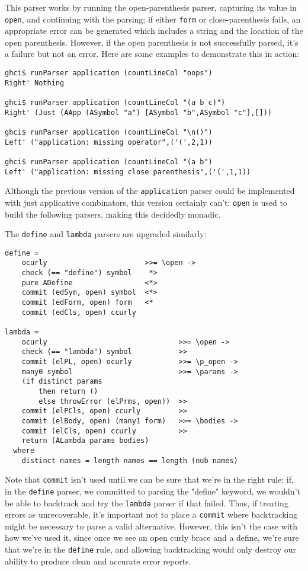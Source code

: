 \documentclass{tmr}
\begin{document}
This parser works by running the open-parenthesis parser, capturing its value in \verb+open+, and continuing
with the parsing; if either \verb+form+ or close-parenthesis fails, an appropriate error can be generated
which includes a string and the location of the open parenthesis.  However, if the open parenthesis is not
successfully parsed, it's a failure but not an error.  Here are some examples to demonstrate this in action:
\begin{verbatim}
ghci$ runParser application (countLineCol "oops")
Right' Nothing

ghci$ runParser application (countLineCol "(a b c)")
Right' (Just (AApp (ASymbol "a") [ASymbol "b",ASymbol "c"],[]))

ghci$ runParser application (countLineCol "\n()")
Left' ("application: missing operator",('(',2,1))

ghci$ runParser application (countLineCol "(a b")
Left' ("application: missing close parenthesis",('(',1,1))
\end{verbatim}
Although the previous version of the \verb+application+ parser could be implemented with just applicative combinators, 
this version certainly can't:  \verb+open+ is used to build the following parsers, making this decidedly monadic.  

The \verb+define+ and \verb+lambda+ parsers are upgraded similarly:
\begin{verbatim}
define =
    ocurly                       >>= \open ->
    check (== "define") symbol    *>
    pure ADefine                 <*>
    commit (edSym, open) symbol  <*>
    commit (edForm, open) form   <*
    commit (edCls, open) ccurly  
    
lambda =
    ocurly                               >>= \open ->
    check (== "lambda") symbol           >>
    commit (elPL, open) ocurly           >>= \p_open ->
    many0 symbol                         >>= \params ->
    (if distinct params 
        then return ()
        else throwError (elPrms, open))  >>
    commit (elPCls, open) ccurly         >>
    commit (elBody, open) (many1 form)   >>= \bodies ->
    commit (elCls, open) ccurly          >>
    return (ALambda params bodies)
  where
    distinct names = length names == length (nub names)
\end{verbatim}
Note that \verb+commit+ isn't used until we can be sure that we're in the right rule:  if, in the \verb+define+
parser, we committed to parsing the "define" keyword, we wouldn't be able to backtrack and try the \verb+lambda+
parser if that failed.  Thus, if treating errors as unrecoverable, it's important not to place a \verb+commit+
where backtracking might be necessary to parse a valid alternative.  However, this isn't the case with how
we've used it, since once we see an open curly brace and a define, we're sure that we're in the \verb+define+
rule, and allowing backtracking would only destroy our ability to produce clean and accurate error reports.
\end{document}
